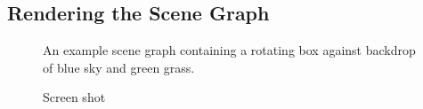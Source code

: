 \documentclass[10pt,aps, prb,preprint]{article}
\begin{document}
\subsection{Rendering the Scene Graph}


\begin{figure}[!h]
\begin{center}
\caption{\label{fig:scene}An example scene graph containing a rotating box against backdrop of blue sky and green grass.}
\end{center}
\end{figure}
\newpage
\begin{figure}[!h]
\label{fig:layerScene}
\begin{center}
\caption{Screen shot}
\end{center}
\end{figure}
\end{document}
